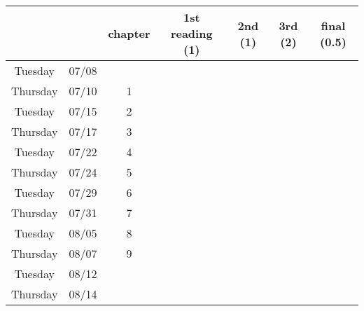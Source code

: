\documentclass[12pt]{article}
\begin{document}
\begin{center}
  \begin{tabular}{ c | c | c | c | c | c | c }
     & & chapter & 1st reading (1) & 2nd (1) & 3rd (2) & final (0.5)\\ \hline
    Tuesday & 07/08 & & & & &\\ \hline
    Thursday & 07/10 & 1  & & & &\\ \hline
    Tuesday & 07/15 & 2  & & & &\\ \hline
    Thursday & 07/17 & 3  & & & &\\ \hline
    Tuesday & 07/22 & 4  & & & &\\ \hline
    Thursday & 07/24 & 5  & & & &\\ \hline
    Tuesday & 07/29 & 6  & & & &\\ \hline
    Thursday & 07/31 & 7  & & & &\\ \hline
    Tuesday & 08/05 & 8  & & & &\\ \hline
    Thursday & 08/07 & 9  & & & &\\ \hline
    Tuesday & 08/12 &   & & & &\\ \hline
    Thursday & 08/14 &   & & & &\\
  \end{tabular}
\end{center}
\end{document}
